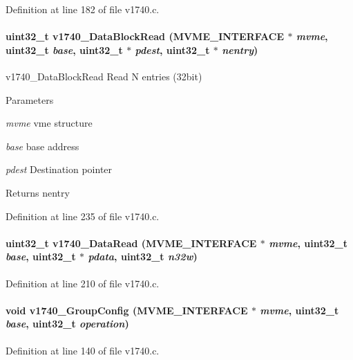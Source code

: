 Definition at line 182 of file v1740.c.
\paragraph[{v1740\_\-DataBlockRead}]{\setlength{\rightskip}{0pt plus 5cm}uint32\_\-t v1740\_\-DataBlockRead ({\bf MVME\_\-INTERFACE} $\ast$ {\em mvme}, \/  uint32\_\-t {\em base}, \/  uint32\_\-t $\ast$ {\em pdest}, \/  uint32\_\-t $\ast$ {\em nentry})}\hfill\label{v1740_8c_a70d16d4fead8e9ea39dd9fcbddca7307}
v1740\_\-DataBlockRead Read N entries (32bit) 
\begin{DoxyParams}{Parameters}
\item[{\em mvme}]vme structure \item[{\em base}]base address \item[{\em pdest}]Destination pointer \end{DoxyParams}
\begin{DoxyReturn}{Returns}
nentry 
\end{DoxyReturn}


Definition at line 235 of file v1740.c.
\paragraph[{v1740\_\-DataRead}]{\setlength{\rightskip}{0pt plus 5cm}uint32\_\-t v1740\_\-DataRead ({\bf MVME\_\-INTERFACE} $\ast$ {\em mvme}, \/  uint32\_\-t {\em base}, \/  uint32\_\-t $\ast$ {\em pdata}, \/  uint32\_\-t {\em n32w})}\hfill\label{v1740_8c_abbde2b06e5b344062c08333c888fb03c}


Definition at line 210 of file v1740.c.
\paragraph[{v1740\_\-GroupConfig}]{\setlength{\rightskip}{0pt plus 5cm}void v1740\_\-GroupConfig ({\bf MVME\_\-INTERFACE} $\ast$ {\em mvme}, \/  uint32\_\-t {\em base}, \/  uint32\_\-t {\em operation})}\hfill\label{v1740_8c_a4366f9498ad2c7a493ae8ef0ae47e79f}


Definition at line 140 of file v1740.c.
